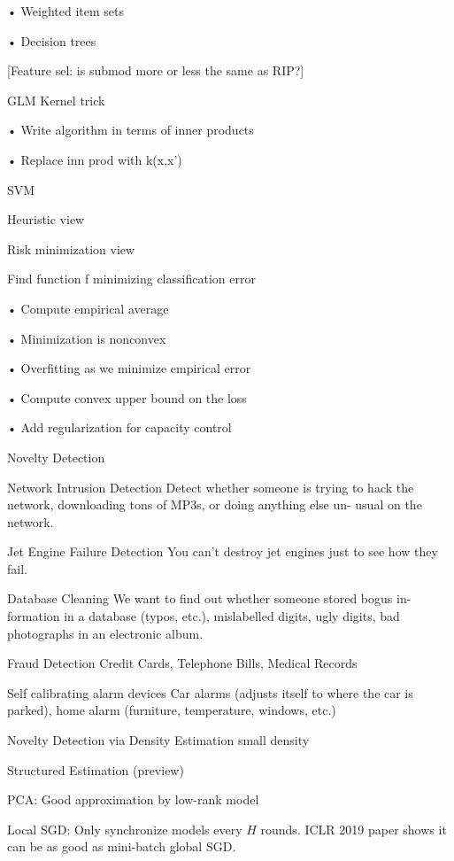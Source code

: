 \documentclass[english]{article}
\begin{document}
• Weighted item sets

• Decision trees

[Feature sel: is submod more or less the same as RIP?]

\eenum 

\item 
 GLM
Kernel trick

• Write algorithm in terms of inner products

• Replace inn prod with k(x,x')
\item 
SVM

Heuristic view

Risk minimization view

Find function f minimizing classification error

• Compute empirical average

• Minimization is nonconvex

• Overfitting as we minimize empirical error

• Compute convex upper bound on the loss

• Add regularization for capacity control

\item

Novelty Detection

Network Intrusion Detection
Detect whether someone is trying to hack the network,
downloading tons of MP3s, or doing anything else un-
usual on the network.

Jet Engine Failure Detection
You can't destroy jet engines just to see how they fail.

Database Cleaning
We want to find out whether someone stored bogus in-
formation in a database (typos, etc.), mislabelled digits,
ugly digits, bad photographs in an electronic album.

Fraud Detection
Credit Cards, Telephone Bills, Medical Records

Self calibrating alarm devices
Car alarms (adjusts itself to where the car is parked),
home alarm (furniture, temperature, windows, etc.)

Novelty Detection via Density Estimation
small density

Structured Estimation (preview)

PCA: Good approximation by low-rank model


\item Local SGD: Only synchronize models every $H$ rounds. ICLR 2019 paper shows it can be as good as mini-batch global SGD.
\end{document}
